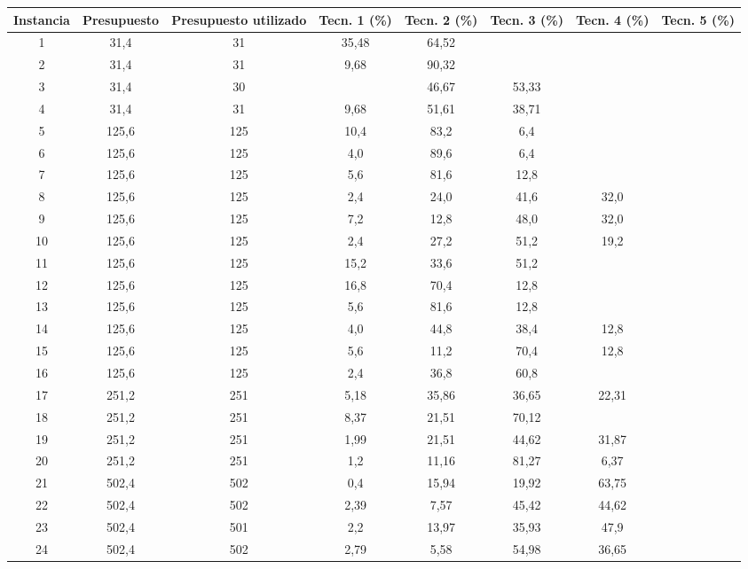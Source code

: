 \begin{table}
  \centering
  \small
  \begin{tabular}{cccccccc}
      \toprule
      Instancia & Presupuesto & Presupuesto utilizado & Tecn. 1 (\%) & Tecn. 2 (\%) & Tecn. 3 (\%) & Tecn. 4 (\%) & Tecn. 5 (\%) \\
      \midrule
      1 & 31,4 & 31 & 35,48 & 64,52 &  &  &  \\
      2 & 31,4 & 31 & 9,68 & 90,32 &  &  &  \\
      3 & 31,4 & 30 &  & 46,67 & 53,33 &  &  \\
      4 & 31,4 & 31 & 9,68 & 51,61 & 38,71 &  &  \\
      5 & 125,6 & 125 & 10,4 & 83,2 & 6,4 &  &  \\
      6 & 125,6 & 125 & 4,0 & 89,6 & 6,4 &  &  \\
      7 & 125,6 & 125 & 5,6 & 81,6 & 12,8 &  &  \\
      8 & 125,6 & 125 & 2,4 & 24,0 & 41,6 & 32,0 &  \\
      9 & 125,6 & 125 & 7,2 & 12,8 & 48,0 & 32,0 &  \\
      10 & 125,6 & 125 & 2,4 & 27,2 & 51,2 & 19,2 &  \\
      11 & 125,6 & 125 & 15,2 & 33,6 & 51,2 &  &  \\
      12 & 125,6 & 125 & 16,8 & 70,4 & 12,8 &  &  \\
      13 & 125,6 & 125 & 5,6 & 81,6 & 12,8 &  &  \\
      14 & 125,6 & 125 & 4,0 & 44,8 & 38,4 & 12,8 &  \\
      15 & 125,6 & 125 & 5,6 & 11,2 & 70,4 & 12,8 &  \\
      16 & 125,6 & 125 & 2,4 & 36,8 & 60,8 &  &  \\
      17 & 251,2 & 251 & 5,18 & 35,86 & 36,65 & 22,31 &  \\
      18 & 251,2 & 251 & 8,37 & 21,51 & 70,12 &  &  \\
      19 & 251,2 & 251 & 1,99 & 21,51 & 44,62 & 31,87 &  \\
      20 & 251,2 & 251 & 1,2 & 11,16 & 81,27 & 6,37 &  \\
      21 & 502,4 & 502 & 0,4 & 15,94 & 19,92 & 63,75 &  \\
      22 & 502,4 & 502 & 2,39 & 7,57 & 45,42 & 44,62 &  \\
      23 & 502,4 & 501 & 2,2 & 13,97 & 35,93 & 47,9 &  \\
      24 & 502,4 & 502 & 2,79 & 5,58 & 54,98 & 36,65 &  \\

\end{tabular}
\end{table}
